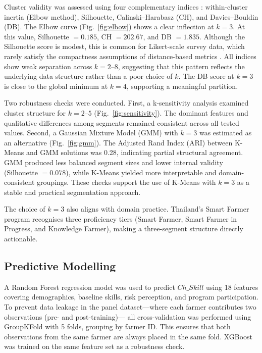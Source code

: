 \documentclass[3p,twocolumn,authoryear]{elsarticle}
\begin{document}
Cluster validity was assessed using four complementary indices
\citep{rouseeuw1987}: within-cluster inertia (Elbow method), Silhouette,
Calinski--Harabasz (CH), and Davies--Bouldin (DB). The Elbow curve
(Fig.~\ref{fig:elbow}) shows a clear inflection at $k = 3$. At this value,
Silhouette $= 0.185$, CH $= 202.67$, and DB $= 1.835$. Although the Silhouette
score is modest, this is common for Likert-scale survey data, which rarely
satisfy the compactness assumptions of distance-based metrics
\citep{rouseeuw1987}. All indices show weak separation across $k = 2$--$8$,
suggesting that this pattern reflects the underlying data structure rather than
a poor choice of $k$. The DB score at $k = 3$ is close to the global minimum at
$k = 4$, supporting a meaningful partition.

Two robustness checks were conducted. First, a k-sensitivity analysis examined
cluster structure for $k = 2$--$5$ (Fig.~\ref{fig:sensitivity}). The dominant
features and qualitative differences among segments remained consistent across
all tested values. Second, a Gaussian Mixture Model (GMM) with $k = 3$ was
estimated as an alternative (Fig.~\ref{fig:gmm}). The Adjusted Rand Index (ARI)
between K-Means and GMM solutions was 0.28, indicating partial structural
agreement. GMM produced less balanced segment sizes and lower internal validity
(Silhouette $= 0.078$), while K-Means yielded more interpretable and
domain-consistent groupings. These checks support the use of K-Means with
$k = 3$ as a stable and practical segmentation approach.

The choice of $k = 3$ also aligns with domain practice. Thailand's Smart Farmer
program recognises three proficiency tiers (Smart Farmer, Smart Farmer in
Progress, and Knowledge Farmer), making a three-segment structure directly
actionable.

\subsection{Predictive Modelling}

A Random Forest regression model \citep{breiman2001} was used to predict
$Ch\_Skill$ using 18 features covering demographics, baseline skills, risk
perception, and program participation. To prevent data leakage in the panel
dataset—where each farmer contributes two observations (pre- and post-training)—
all cross-validation was performed using GroupKFold with 5 folds, grouping by
farmer ID. This ensures that both observations from the same farmer are always
placed in the same fold. XGBoost \citep{chen2016} was trained on the same
feature set as a robustness check.
\end{document}

